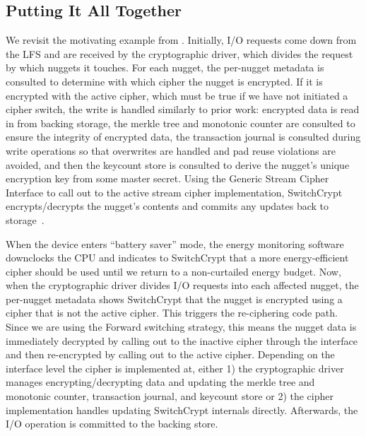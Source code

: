 \subsection{Putting It All Together} \label{subsec:summary}

We revisit the motivating example from . Initially, I/O
requests come down from the LFS and are received by the cryptographic driver,
which divides the request by which nuggets it touches. For each nugget, the
per-nugget metadata is consulted to determine with which cipher the nugget is
encrypted. If it is encrypted with the active cipher, which must be true if we
have not initiated a cipher switch, the write is handled similarly to prior
work: encrypted data is read in from backing storage, the merkle tree and
monotonic counter are consulted to ensure the integrity of encrypted data, the
transaction journal is consulted during write operations so that overwrites are
handled and pad reuse violations are avoided, and then the keycount store is
consulted to derive the nugget's unique encryption key from some master secret.
Using the Generic Stream Cipher Interface to call out to the active stream
cipher implementation, SwitchCrypt encrypts/decrypts the nugget's contents and
commits any updates back to storage~\cite{StrongBox}.

When the device enters ``battery saver'' mode, the energy monitoring software
downclocks the CPU and indicates to SwitchCrypt that a more energy-efficient
cipher should be used until we return to a non-curtailed energy budget. Now,
when the cryptographic driver divides I/O requests into each affected nugget,
the per-nugget metadata shows SwitchCrypt that the nugget is encrypted using a
cipher that is not the active cipher. This triggers the re-ciphering code path.
Since we are using the Forward switching strategy, this means the nugget data is
immediately decrypted by calling out to the inactive cipher through the
interface and then re-encrypted by calling out to the active cipher. Depending
on the interface level the cipher is implemented at, either 1) the cryptographic
driver manages encrypting/decrypting data and updating the merkle tree and
monotonic counter, transaction journal, and keycount store or 2) the cipher
implementation handles updating SwitchCrypt internals directly. Afterwards, the
I/O operation is committed to the backing store.
